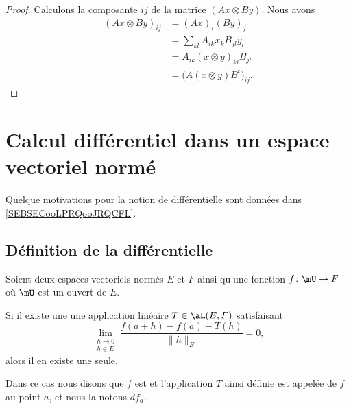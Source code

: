 \begin{proof}
    Calculons la composante \( ij\) de la matrice \( (Ax\otimes By)\). Nous avons
    \begin{subequations}
        \begin{align}
            (Ax\otimes By)_{ij}&=(Ax)_i(By)_j\\
            &=\sum_{kl}A_{ik}x_kB_{jl}y_l\\
            &=A_{ik}(x\otimes y)_{kl}B_{jl}\\
            &=\big( A(x\otimes y)B^t \big)_{ij}.
        \end{align}
    \end{subequations}
\end{proof}

\section{Calcul différentiel dans un espace vectoriel normé}
\label{SecLStKEmc}

Quelque motivations pour la notion de différentielle sont données dans \ref{SEBSECooLPRQooJRQCFL}.

\subsection{Définition de la différentielle}

\begin{propositionDef}      \label{DefDifferentiellePta}
    Soient deux espaces vectoriels normés \( E\) et \( F\) ainsi qu'une fonction \( f\colon \mU\to F\) où \( \mU\) est un ouvert de \( E\).

  Si il existe une une application linéaire \( T\in\aL(E,F)\) satisfaisant
  \begin{equation}	\label{EqCritereDefDiff}
      \lim_{\substack{h\to 0\\h\in E}}\frac{f(a+h)-f(a)-T(h)}{\|h\|_E}=0,
  \end{equation}
  alors il en existe une seule.

  Dans ce cas nous disons que $f$ est  et l'application $T$ ainsi définie est appelée  de $f$ au point $a$, et nous la notons $df_a$.
\end{propositionDef}

